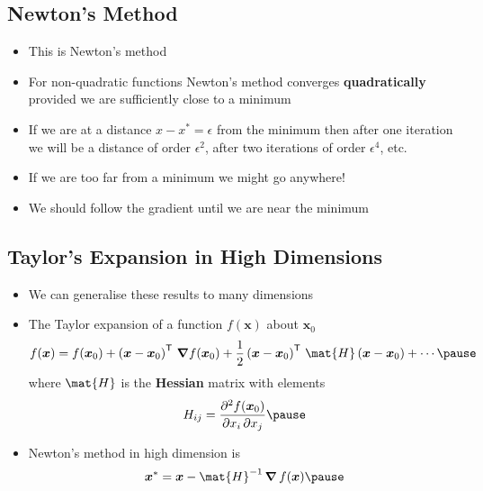 \begin{slide}
\section{Newton's Method}

\begin{PauseHighLight}

\begin{itemize}
\item This is Newton's method\pause
\item For non-quadratic functions Newton's method converges
  \textbf{quadratically} provided we are sufficiently close to a minimum\pause
\item If we are at a distance $x-x^*=\epsilon$ from the minimum then
  after one iteration we will be a distance of order $\epsilon^2$\pause, after
  two iterations of order $\epsilon^4$, etc.\pauseb
\item If we are too far from a minimum we might go anywhere!\pause
\item We should follow the gradient until we are near the minimum\pause
\end{itemize}

\end{PauseHighLight}
\end{slide}


\begin{slide}
\section[-1.5]{Taylor's Expansion in High Dimensions}

\begin{PauseHighLight}

\begin{itemize}\squeeze
\item We can generalise these results to many dimensions\pause
\item The Taylor expansion of a function $f(\bm{x})$ about $\bm{x}_0$
  \begin{displaymath}
        f(\bm{x}) = f(\bm{x}_0) + \left(\bm{x}-\bm{x}_0\right)^\tr\,
    \grad f(\bm{x}_0) + \frac{1}{2} \left(\bm{x}-\bm{x}_0\right)^\tr\,
    \mat{H} \left(\bm{x}-\bm{x}_0\right) + \cdots\pause
  \end{displaymath}
  where $\mat{H}$ is the \textbf{Hessian} matrix with elements
  \begin{displaymath}
    H_{ij} = \frac{\partial^2 f(\bm{x}_0)}{\partial x_i \,\partial x_j}
    \pause 
  \end{displaymath}
\item Newton's method in high dimension is
  \begin{displaymath}
    \bm{x}^* = \bm{x} - \mat{H}^{-1} \, \grad \,f(\bm{x})\pause
  \end{displaymath}
\end{itemize}

\end{PauseHighLight}
\end{slide}

